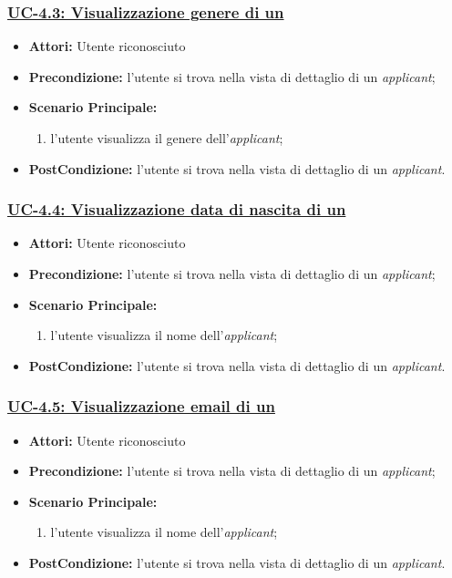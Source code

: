 \subsubsection{\underline{UC-4.3: Visualizzazione genere di un \applicant}}
\begin{itemize}
	\item \textbf{Attori:} Utente riconosciuto
	\item \textbf{Precondizione:} l'utente si trova nella vista di dettaglio di un \textit{applicant};
	\item \textbf{Scenario Principale:}
	\begin{enumerate} 
		\item l'utente visualizza il genere dell'\textit{applicant};
	\end{enumerate}
	\item \textbf{PostCondizione:} l'utente si trova nella vista di dettaglio di un \textit{applicant}.
\end{itemize}

\subsubsection{\underline{UC-4.4: Visualizzazione data di nascita di un \applicant}}
\begin{itemize}
	\item \textbf{Attori:} Utente riconosciuto
	\item \textbf{Precondizione:} l'utente si trova nella vista di dettaglio di un \textit{applicant};
	\item \textbf{Scenario Principale:}
	\begin{enumerate} 
		\item l'utente visualizza il nome dell'\textit{applicant};
	\end{enumerate}
	\item \textbf{PostCondizione:} l'utente si trova nella vista di dettaglio di un \textit{applicant}.
\end{itemize}

\subsubsection{\underline{UC-4.5: Visualizzazione email di un \applicant}}
\begin{itemize}
	\item \textbf{Attori:} Utente riconosciuto
	\item \textbf{Precondizione:} l'utente si trova nella vista di dettaglio di un \textit{applicant};
	\item \textbf{Scenario Principale:}
	\begin{enumerate} 
		\item l'utente visualizza il nome dell'\textit{applicant};
	\end{enumerate}
	\item \textbf{PostCondizione:} l'utente si trova nella vista di dettaglio di un \textit{applicant}.
\end{itemize}

